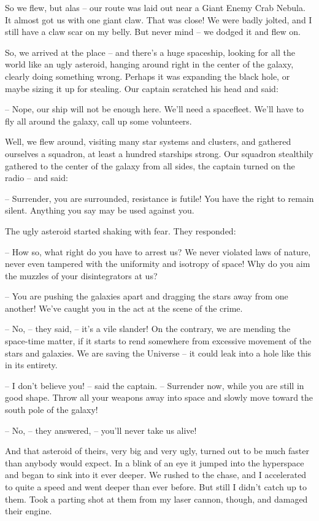 \documentclass[ebook,oneside,final,openright]{memoir}
\begin{document}
So we flew, but alas – our route was laid out near a Giant Enemy Crab Nebula. It almost got us with one giant claw. That was close! We were badly jolted, and I still have a claw scar on my belly. But never mind – we dodged it and flew on. \par
\par
So, we arrived at the place – and there’s a huge spaceship, looking for all the world like an ugly asteroid, hanging around right in the center of the galaxy, clearly doing something wrong. Perhaps it was expanding the black hole, or maybe sizing it up for stealing. Our captain scratched his head and said:\par
– Nope, our ship will not be enough here. We’ll need a spacefleet. We’ll have to fly all around the galaxy, call up some volunteers.\par
Well, we flew around, visiting many star systems and clusters, and gathered ourselves a squadron, at least a hundred starships strong. Our squadron stealthily gathered to the center of the galaxy from all sides, the captain turned on the radio – and said:\par
– Surrender, you are surrounded, resistance is futile! You have the right to remain silent. Anything you say may be used against you.\par
The ugly asteroid started shaking with fear. They responded:\par
– How so, what right do you have to arrest us? We never violated laws of nature, never even tampered with the uniformity and isotropy of space! Why do you aim the muzzles of your disintegrators at us?\par
– You are pushing the galaxies apart and dragging the stars away from one another! We’ve caught you in the act at the scene of the crime.\par
– No, – they said, – it’s a vile slander! On the contrary, we are mending the space-time matter, if it starts to rend somewhere from excessive movement of the stars and galaxies. We are saving the Universe – it could leak into a hole like this in its entirety.\par
– I don’t believe you! – said the captain. – Surrender now, while you are still in good shape. Throw all your weapons away into space and slowly move toward the south pole of the galaxy!\par
– No, – they answered, – you’ll never take us alive!\par
And that asteroid of theirs, very big and very ugly, turned out to be much faster than anybody would expect. In a blink of an eye it jumped into the hyperspace and began to sink into it ever deeper. We rushed to the chase, and I accelerated to quite a speed and went deeper than ever before. But still I didn’t catch up to them. Took a parting shot at them from my laser cannon, though, and damaged their engine.\par
\end{document}
